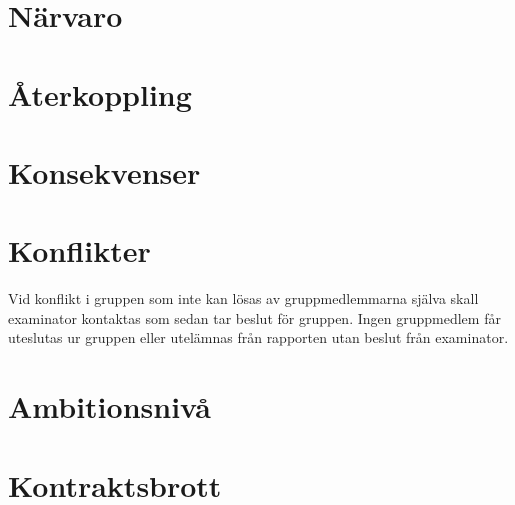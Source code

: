 \section*{Närvaro}

\section*{Återkoppling}

\section*{Konsekvenser}

\section*{Konflikter}


Vid konflikt i gruppen som inte kan lösas av gruppmedlemmarna själva skall examinator kontaktas som sedan tar beslut för gruppen.
Ingen gruppmedlem får uteslutas ur gruppen eller utelämnas från rapporten utan beslut från examinator.

\section*{Ambitionsnivå}

\section*{Kontraktsbrott}

